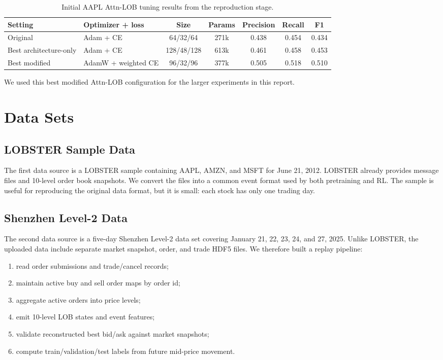 \documentclass[11pt]{article}
\begin{document}
\begin{table}[H]
\centering
\caption{Initial AAPL Attn-LOB tuning results from the reproduction stage.}
\label{tab:aapl_tuning}
\begin{tabular}{llccccc}
\toprule
Setting & Optimizer + loss & Size & Params & Precision & Recall & F1 \\
\midrule
Original & Adam + CE & 64/32/64 & 271k & 0.438 & 0.454 & 0.434 \\
Best architecture-only & Adam + CE & 128/48/128 & 613k & 0.461 & 0.458 & 0.453 \\
Best modified & AdamW + weighted CE & 96/32/96 & 377k & 0.505 & 0.518 & 0.510 \\
\bottomrule
\end{tabular}
\end{table}

We used this best modified Attn-LOB configuration for the larger experiments in
this report.

\section{Data Sets}

\subsection{LOBSTER Sample Data}

The first data source is a LOBSTER sample containing AAPL, AMZN, and MSFT for
June 21, 2012. LOBSTER already provides message files and 10-level order book
snapshots. We convert the files into a common event format used by both
pretraining and RL. The sample is useful for reproducing the original data
format, but it is small: each stock has only one trading day.

\subsection{Shenzhen Level-2 Data}

The second data source is a five-day Shenzhen Level-2 data set covering January
21, 22, 23, 24, and 27, 2025. Unlike LOBSTER, the uploaded data include separate
market snapshot, order, and trade HDF5 files. We therefore built a replay
pipeline:

\begin{enumerate}
  \item read order submissions and trade/cancel records;
  \item maintain active buy and sell order maps by order id;
  \item aggregate active orders into price levels;
  \item emit 10-level LOB states and event features;
  \item validate reconstructed best bid/ask against market snapshots;
  \item compute train/validation/test labels from future mid-price movement.
\end{enumerate}
\end{document}
